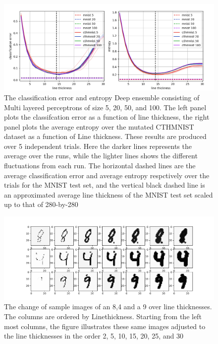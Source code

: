 \begin{figure}[t]
    \centering
    \includegraphics[scale=0.6]{figure/mlpensemble.png}
    \caption{The classification error and entropy Deep ensemble consisting of Multi layered perceptrons of size 5, 20, 50, and 100. The left panel plots the classifcation error as a function of line thickness, the right panel plots the average entropy over the mutated  CTHMNIST dataset as a function of Line thickness. These results are produced over 5 independent trials. Here the darker lines represents the average over the runs, while the lighter lines shows the different fluctuations from each run. The horizontal dashed lines are the average classification error and average entropy respctively over the trials for the MNIST test set, and the vertical black dashed line is an approximated average line thickness of the MNIST test set scaled up to that of 280-by-280}
    \label{fig:mlpensemble}
\end{figure}

\begin{figure}[h!]
    \centering
    \includegraphics[scale = 0.5]{figure/digits.png}
    \caption{The change of sample images of an 8,4 and a 9 over line thicknesses. The columns are ordered by Linethickness. Starting from the left most columns, the figure illustrates these same images adjusted to the line thicknesses in the order 2, 5, 10, 15, 20, 25, and 30}
    \label{fig:digits}
\end{figure}


